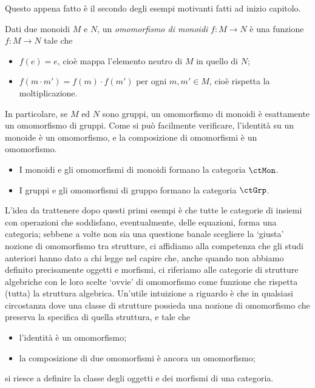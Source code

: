 Questo appena fatto è il secondo degli esempi motivanti fatti ad inizio capitolo.
\begin{example}\label{ex_cat_monoidi}
	Dati due monoidi \(M\) e \(N\), un \emph{omomorfismo di monoidi} \(f:M\to N\) è una funzione \(f:M\to N\) tale che
	\begin{itemize}
		\item \(f(e) = e\), cioè mappa l'elemento neutro di \(M\) in quello di \(N\);
		\item \(f(m\cdot m')=f(m)\cdot f(m')\) per ogni \(m,m'\in M\), cioè rispetta la moltiplicazione.
	\end{itemize}
	In particolare, se \(M\) ed \(N\) sono gruppi, un omomorfismo di monoidi è esattamente un omomorfismo di gruppi.
	Come si può facilmente verificare, l'identità su un monoide è un omomorfismo, e la composizione di omomorfismi è un omomorfismo.
	\begin{itemize}
		\item I monoidi e gli omomorfismi di monoidi formano la categoria \(\ctMon\).
		\item I gruppi e gli omomorfismi di gruppo formano la categoria \(\ctGrp\).
	\end{itemize}
\end{example}
L'idea da trattenere dopo questi primi esempi è che tutte le categorie di insiemi con operazioni che soddisfano, eventualmente, delle equazioni, forma una categoria; sebbene a volte non sia una questione banale scegliere la `giusta' nozione di omomorfismo tra strutture, ci affidiamo alla competenza che gli studi anteriori hanno dato a chi legge nel capire che, anche quando non abbiamo definito precisamente oggetti e morfismi, ci riferiamo alle categorie di strutture algebriche con le loro scelte `ovvie' di omomorfismo come funzione che rispetta (tutta) la struttura algebrica. Un'utile intuizione a riguardo è che in qualsiasi circostanza dove una classe di strutture possieda una nozione di omomorfismo che preserva la specifica di quella struttura, e tale che
\begin{itemize}
	\item l'identità è un omomorfismo;
	\item la composizione di due omomorfismi è ancora un omomorfismo;
\end{itemize}
si riesce a definire la classe degli oggetti e dei morfismi di una categoria.

